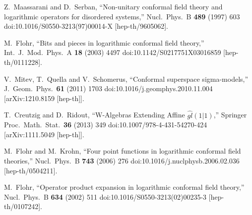 \documentclass[12pt]{article}
\numberwithin{equation}{section}
\numberwithin{equation}{section}
\numberwithin{table}{section}\setlength{\multlinegap}{25pt}
\begin{document}
\begin{thebibliography}{99}
  Z.~Maassarani and D.~Serban,
  ``Non-unitary conformal field theory and logarithmic operators for disordered systems,''
  Nucl.\ Phys.\ B {\bf 489} (1997) 603
  doi:10.1016/S0550-3213(97)00014-X
  [hep-th/9605062].

  M.~Flohr,
  ``Bits and pieces in logarithmic conformal field theory,''
  Int.\ J.\ Mod.\ Phys.\ A {\bf 18} (2003) 4497
  doi:10.1142/S0217751X03016859
  [hep-th/0111228].

  V.~Mitev, T.~Quella and V.~Schomerus,
  ``Conformal superspace sigma-models,''
  J.\ Geom.\ Phys.\  {\bf 61} (2011) 1703
  doi:10.1016/j.geomphys.2010.11.004
  [arXiv:1210.8159 [hep-th]].


  T.~Creutzig and D.~Ridout,
  ``W-Algebras Extending Affine $\hat{gl}(1|1)$,''
  Springer Proc.\ Math.\ Stat.\  {\bf 36} (2013) 349
  doi:10.1007/978-4-431-54270-424
  [arXiv:1111.5049 [hep-th]].

  M.~Flohr and M.~Krohn,
  ``Four point functions in logarithmic conformal field theories,''
  Nucl.\ Phys.\ B {\bf 743} (2006) 276
  doi:10.1016/j.nuclphysb.2006.02.036
  [hep-th/0504211].

  M.~Flohr,
  ``Operator product expansion in logarithmic conformal field theory,''
  Nucl.\ Phys.\ B {\bf 634} (2002) 511
  doi:10.1016/S0550-3213(02)00235-3
  [hep-th/0107242].





  
\end{thebibliography}
\end{document}
